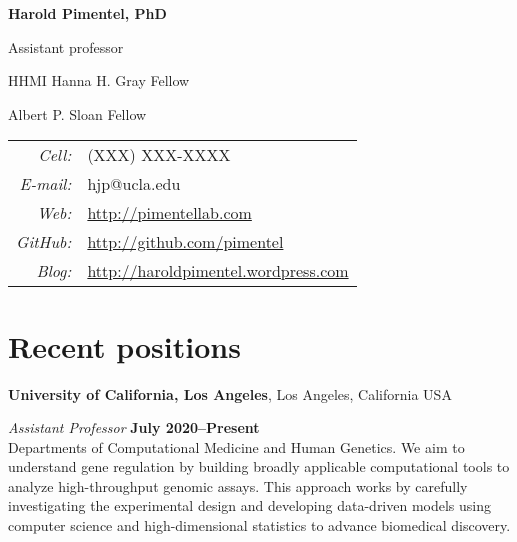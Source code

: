\documentclass[11pt,notitlepage]{article} %
\begin{document}
\thispagestyle{firststyle}





\begin{center}
  {\Huge \bf Harold Pimentel, PhD}

  \medskip
  {\large Assistant professor}

  \medskip

  {\large HHMI Hanna H. Gray Fellow}

  \medskip

  {\large Albert P. Sloan Fellow}

\end{center}
\bigskip
\begin{tabular}{r l}
  {\it Cell:}&  {(XXX) XXX-XXXX} \\
  {\it E-mail:}&  {hjp@ucla.edu} \\
  {\it Web:}& {\url{http://pimentellab.com}} \\
  {\it GitHub:}& {\url{http://github.com/pimentel}} \\
  {\it Blog:}& {\url{http://haroldpimentel.wordpress.com}} \\
\end{tabular}

\bigskip
\section*{Recent positions}
\medskip

{\bf University of California, Los Angeles}, Los Angeles, California USA

{\em Assistant Professor} \hfill {\bf July 2020--Present}\\
Departments of Computational Medicine and Human Genetics.
We aim to understand gene regulation by building broadly applicable computational tools to analyze high-throughput genomic assays.
This approach works by carefully investigating the experimental design and developing data-driven models using computer science and high-dimensional statistics to advance biomedical discovery.
\end{document}
